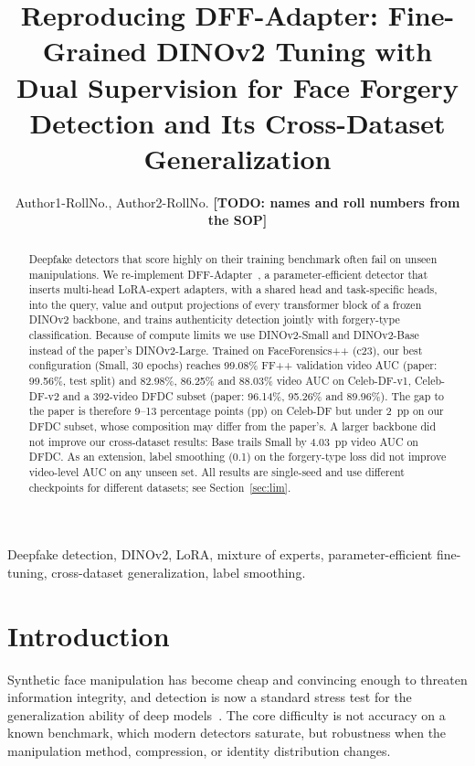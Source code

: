 \documentclass[lettersize,journal]{IEEEtran}
\newcommand{\todo}[1]{\textbf{[TODO: #1]}}
\begin{document}
\title{Reproducing DFF-Adapter: Fine-Grained DINOv2 Tuning with Dual Supervision for Face Forgery Detection and Its Cross-Dataset Generalization}

\author{Author1-RollNo., Author2-RollNo. \todo{names and roll numbers from the SOP}}

\maketitle

\begin{abstract}
Deepfake detectors that score highly on their training benchmark often fail on unseen manipulations. We re-implement DFF-Adapter~\cite{zhang2026dff}, a parameter-efficient detector that inserts multi-head LoRA-expert adapters, with a shared head and task-specific heads, into the query, value and output projections of every transformer block of a frozen DINOv2 backbone, and trains authenticity detection jointly with forgery-type classification. Because of compute limits we use DINOv2-Small and DINOv2-Base instead of the paper's DINOv2-Large. Trained on FaceForensics++ (c23), our best configuration (Small, 30 epochs) reaches 99.08\% FF++ validation video AUC (paper: 99.56\%, test split) and 82.98\%, 86.25\% and 88.03\% video AUC on Celeb-DF-v1, Celeb-DF-v2 and a 392-video DFDC subset (paper: 96.14\%, 95.26\% and 89.96\%). The gap to the paper is therefore 9--13 percentage points (pp) on Celeb-DF but under 2~pp on our DFDC subset, whose composition may differ from the paper's. A larger backbone did not improve our cross-dataset results: Base trails Small by 4.03~pp video AUC on DFDC. As an extension, label smoothing (0.1) on the forgery-type loss did not improve video-level AUC on any unseen set. All results are single-seed and use different checkpoints for different datasets; see Section~\ref{sec:lim}.
\end{abstract}

\begin{IEEEkeywords}
Deepfake detection, DINOv2, LoRA, mixture of experts, parameter-efficient fine-tuning, cross-dataset generalization, label smoothing.
\end{IEEEkeywords}

\section{Introduction}
Synthetic face manipulation has become cheap and convincing enough to threaten information integrity, and detection is now a standard stress test for the generalization ability of deep models~\cite{lecun2015deep}. The core difficulty is not accuracy on a known benchmark, which modern detectors saturate, but robustness when the manipulation method, compression, or identity distribution changes.
\end{document}

